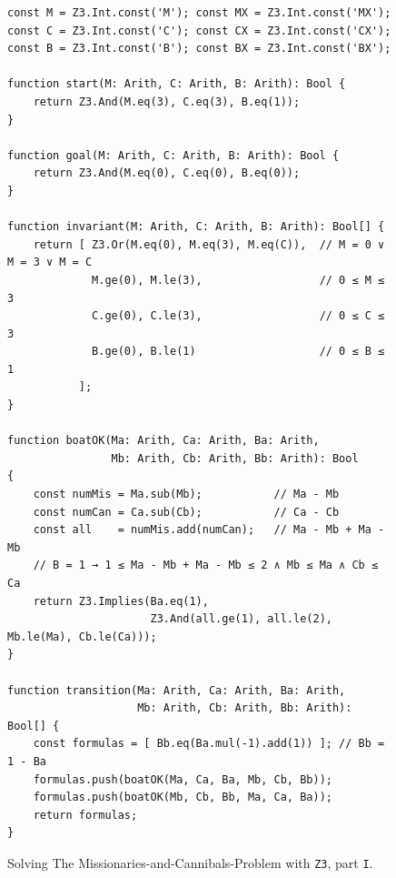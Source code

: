 \begin{figure}[!ht]
\centering
\begin{verbatim}
const M = Z3.Int.const('M'); const MX = Z3.Int.const('MX');
const C = Z3.Int.const('C'); const CX = Z3.Int.const('CX');
const B = Z3.Int.const('B'); const BX = Z3.Int.const('BX');

function start(M: Arith, C: Arith, B: Arith): Bool {
    return Z3.And(M.eq(3), C.eq(3), B.eq(1));
}

function goal(M: Arith, C: Arith, B: Arith): Bool {
    return Z3.And(M.eq(0), C.eq(0), B.eq(0));
}

function invariant(M: Arith, C: Arith, B: Arith): Bool[] {
    return [ Z3.Or(M.eq(0), M.eq(3), M.eq(C)),  // M = 0 ∨ M = 3 ∨ M = C
             M.ge(0), M.le(3),                  // 0 ≤ M ≤ 3 
             C.ge(0), C.le(3),                  // 0 ≤ C ≤ 3 
             B.ge(0), B.le(1)                   // 0 ≤ B ≤ 1 
           ];
}

function boatOK(Ma: Arith, Ca: Arith, Ba: Arith,
                Mb: Arith, Cb: Arith, Bb: Arith): Bool
{
    const numMis = Ma.sub(Mb);           // Ma - Mb
    const numCan = Ca.sub(Cb);           // Ca - Cb
    const all    = numMis.add(numCan);   // Ma - Mb + Ma - Mb
    // B = 1 → 1 ≤ Ma - Mb + Ma - Mb ≤ 2 ∧ Mb ≤ Ma ∧ Cb ≤ Ca
    return Z3.Implies(Ba.eq(1),
                      Z3.And(all.ge(1), all.le(2), Mb.le(Ma), Cb.le(Ca)));
}

function transition(Ma: Arith, Ca: Arith, Ba: Arith,
                    Mb: Arith, Cb: Arith, Bb: Arith): Bool[] { 
    const formulas = [ Bb.eq(Ba.mul(-1).add(1)) ]; // Bb = 1 - Ba
    formulas.push(boatOK(Ma, Ca, Ba, Mb, Cb, Bb));
    formulas.push(boatOK(Mb, Cb, Bb, Ma, Ca, Ba));
    return formulas;
}
\end{verbatim}
\vspace*{-0.3cm}
\caption{Solving The Missionaries-and-Cannibals-Problem with \texttt{Z3}, part \texttt{I}.}
\label{fig:Missionaries-Z3.ipynb-1}
\end{figure}

